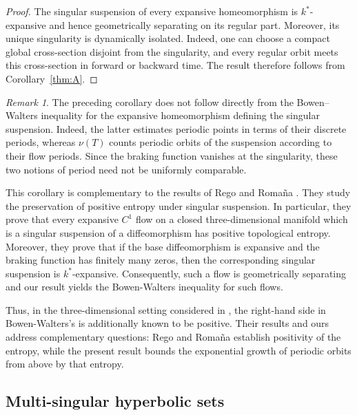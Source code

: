 \documentclass[11pt,reqno]{amsart}
\theoremstyle{definition}
\theoremstyle{remark}
\newtheorem{remark}[theorem]{Remark}
\begin{document}
\begin{proof}
The singular suspension of every expansive homeomorphism is
$k^*$-expansive \cite{s} and hence geometrically separating on its regular part.
Moreover, its unique singularity is dynamically isolated. Indeed, one can
choose a compact global cross-section disjoint from the singularity, and
every regular orbit meets this cross-section in forward or backward time.
The result therefore follows from Corollary~\ref{thm:A}.
\end{proof}

\begin{remark}
The preceding corollary does not follow directly from the
Bowen--Walters inequality for the expansive homeomorphism defining the
singular suspension. Indeed, the latter estimates periodic points in
terms of their discrete periods, whereas $\nu(T)$ counts periodic
orbits of the suspension according to their flow periods. Since the
braking function vanishes at the singularity, these two notions of
period need not be uniformly comparable.

This corollary is complementary to the results of Rego and Romaña
\cite{rr}. They study the preservation of positive entropy under
singular suspension. In particular, they prove that every expansive
$C^1$ flow on a closed three-dimensional manifold which is a singular
suspension of a diffeomorphism has positive topological entropy.
Moreover, they prove that if the base diffeomorphism is expansive and
the braking function has finitely many zeros, then the corresponding
singular suspension is $k^*$-expansive. Consequently, such a flow is geometrically separating and our result yields the Bowen-Walters inequality for such flows.

Thus, in the three-dimensional setting considered in \cite{rr}, the
right-hand side in Bowen-Walters's is additionally known to be positive. Their results
and ours address complementary questions: Rego and Romaña establish
positivity of the entropy, while the present result bounds the
exponential growth of periodic orbits from above by that entropy.
\end{remark}









\subsection{Multi-singular hyperbolic sets}
\label{subsec:multisingular}
\end{document}
